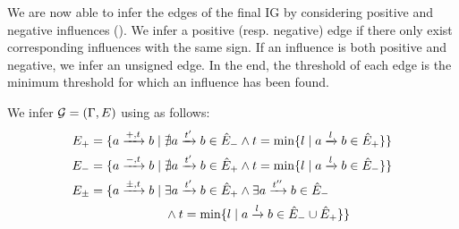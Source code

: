 We are now able to infer the edges of the final IG by considering positive and negative influences
().
We infer a positive (resp. negative) edge if there only exist corresponding influences with the same sign.
If an influence is both positive and negative, we infer an unsigned edge.
In the end, the threshold of each edge is the minimum threshold for which an influence has been found.
%
\begin{proposition}\label{pps:inference-IG}
We infer $\mathcal{G} = (\Gamma,E)$ using  as follows:
\begin{align*}
E_+ &= \{ a \xrightarrow{+, t} b \mid \nexists a \xrightarrow{t'} b \in \hat{E}_-
  \wedge t = \min \{ l \mid a \xrightarrow{l} b \in \hat{E}_+\}\} \\
E_- &= \{ a \xrightarrow{-, t} b \mid \nexists a \xrightarrow{t'} b \in \hat{E}_+
  \wedge t = \min \{l \mid a \xrightarrow{l} b \in \hat{E}_-\}\} \\
E_\pm &= \{ a \xrightarrow{\pm, t} b \mid \exists a \xrightarrow{t'} b \in \hat{E}_+ \wedge \exists a \xrightarrow{t''} b \in \hat{E}_- \\
  & \qquad\qquad\qquad \wedge t = \min \{l \mid a \xrightarrow{l} b \in \hat{E}_- \cup \hat{E}_+\}\}
\end{align*}
\end{proposition}

